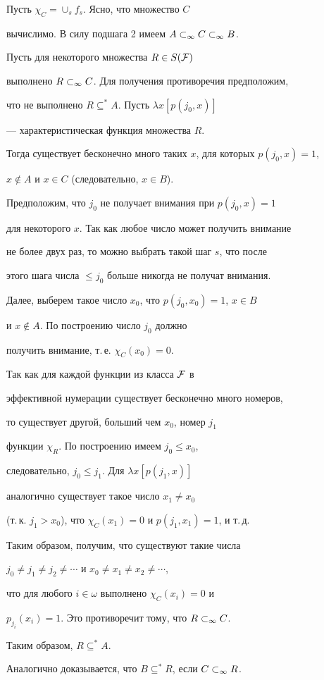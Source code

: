 \begin{pf}
Пусть $\chi_C=\cup_sf_s$. Ясно, что множество $C$


вычислимо. В силу подшага 2 имеем ${A}\subset_\infty{{C}\subset_\infty{B}}$.





Пусть для некоторого множества $R\in S(\cal{F})$


выполнено ${R}\subset_\infty{C}$. Для получения противоречия предположим,


что не выполнено $R\subseteq^*A$. Пусть $\lambda x[p(j_0,x)]$


--- характеристическая функция множества $R$.


Тогда существует бесконечно много таких $x$, для которых $p(j_0,x)=1$,


$x\notin A$ и $x\in C$ (следовательно, $x\in B$).





Предположим, что $j_0$ не получает внимания при $p(j_0,x)=1$


для некоторого $x$. Так как любое число может получить внимание


не более двух раз, то можно выбрать такой шаг $s$, что после


этого шага числа $\le j_0$ больше никогда не получат внимания.


Далее, выберем такое число $x_0$, что $p(j_0,x_0)=1$, $x\in B$


и $x\notin A$. По построению число $j_0$ должно


получить внимание, т.\,е. $\chi_C(x_0)=0$.





Так как для каждой функции из класса $\cal{F}$ в


эффективной нумерации существует бесконечно много номеров,


то существует другой, больший чем $x_0$, номер $j_1$


функции $\chi_R$. По построению имеем $j_0\le x_0$,


следовательно, $j_0\le j_1$. Для $\lambda x[p(j_1,x)]$


аналогично существует такое число $x_1\ne x_0$


(т.\,к. $j_1>x_0$), что $\chi_C(x_1)=0$ и $p(j_1,x_1)=1$, и т.\,д.





Таким образом, получим, что существуют такие числа


$j_0\ne j_1\ne j_2\ne\dotsb$ и $x_0\ne x_1\ne x_2\ne\dotsb$,


что для любого $i\in\omega$ выполнено $\chi_C(x_i)=0$ и


$p_{j_i}(x_i)=1$. Это противоречит тому, что ${R}\subset_\infty{C}$.


Таким образом, $R\subseteq^*A$.





Аналогично доказывается, что $B\subseteq^*R$, если ${C}\subset_\infty{R}$.


\end{pf}





